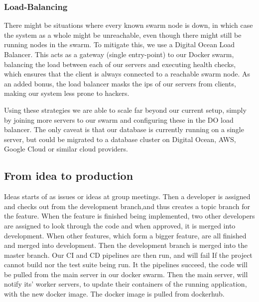 \subsubsection{Load-Balancing}
There might be situations where every known swarm node is down, in which case the system as a whole might be unreachable, even though there might still be running nodes in the swarm.
\newline
To mitigate this, we use a Digital Ocean Load Balancer. This acts as a gateway (single entry-point) to our Docker swarm, balancing the load between each of our servers and executing health checks, which ensures that the client is always connected to a reachable swarm node.
\newline
As an added bonus, the load balancer masks the ips of our servers from clients, making our system less prone to hackers.

Using these strategies we are able to scale far beyond our current setup, simply by joining more servers to our swarm and configuring these in the DO load balancer.
The only caveat is that our database is currently running on a single server, but could be migrated to a database cluster on Digital Ocean, AWS, Google Cloud or similar cloud providers.

\subsection{From idea to production}

Ideas starts of as issues or ideas at group meetings.
Then a developer is assigned and checks out from the development branch,and thus creates a topic branch for the feature.
When the feature is finished being implemented, two other developers are assigned to look through the code and when approved, it is merged into development.
When other features, which form a bigger feature, are all finished and merged into development.
Then the development branch is merged into the master branch.
Our CI and CD pipelines are then run, and will fail 
If the project cannot build nor the test suite being run.
It the pipelines succeed, the code will be pulled from the main server in our docker swarm.
Then the main server, will notify its' worker servers, to update their containers of the running application, with the new docker image. The docker image is pulled from dockerhub.
